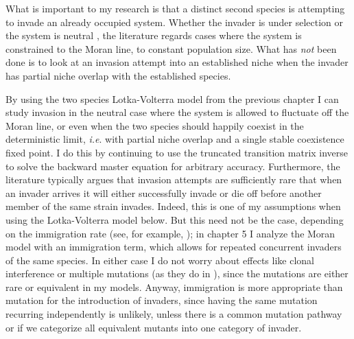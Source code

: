 What is important to my research is that a distinct second species is attempting to invade an already occupied system. 
Whether the invader is under selection \cite{Kimura1955} or the system is neutral \cite{Crow1956,Hubbell2001}, the literature regards cases where the system is constrained to the Moran line, to constant population size. %
What has \emph{not} been done is to look at an invasion attempt into an established niche when the invader has partial niche overlap with the established species. 

By using the two species Lotka-Volterra model from the previous chapter I can study invasion in the neutral case where the system is allowed to fluctuate off the Moran line, or even when the two species should happily coexist in the deterministic limit, \emph{i.e}. with partial niche overlap and a single stable coexistence fixed point. 
I do this by continuing to use the truncated transition matrix inverse to solve the backward master equation for arbitrary accuracy. 
Furthermore, the literature typically argues that invasion attempts are sufficiently rare that when an invader arrives it will either successfully invade or die off before another member of the same strain invades. 
Indeed, this is one of my assumptions when using the Lotka-Volterra model below. 
But this need not be the case, depending on the immigration rate (see, for example, \cite{Goyal2015}); in chapter 5 I analyze the Moran model with an immigration term, which allows for repeated concurrent invaders of the same species. 
In either case I do not worry about effects like clonal interference or multiple mutations (as they do in \cite{Desai2007}), since the mutations are either rare or equivalent in my models. 
Anyway, immigration is more appropriate than mutation for the introduction of invaders, since having the same mutation recurring independently is unlikely, unless there is a common mutation pathway or if we categorize all equivalent mutants into one category of invader. 

